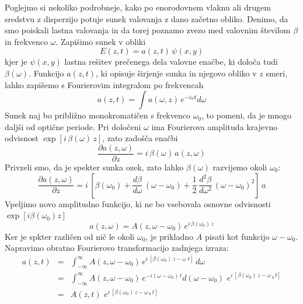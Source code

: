 \documentclass[11pt,fleqn]{book} %
\begin{document}
Poglejmo si nekoliko podrobneje, kako po enorodovnem vlaknu ali drugem
sredstvu z disperzijo potuje sunek valovanja z dano začetno obliko.
Denimo, da smo poiskali lastna valovanja in da torej poznamo zvezo
med valovnim številom $\beta$ in frekvenco $\omega$. Zapišimo sunek
v obliki 
\begin{equation}
E\left(z,t\right)=a\left(z,t\right)\,\psi\left(x,y\right)\label{9.61}
\end{equation}
 kjer je $\psi\left(x,y\right)$ lastna rešitev prečenega dela valovne
enačbe, ki določa tudi $\beta\left(\omega\right)$. Funkcijo $a\left(z,t\right)$,
ki opisuje širjenje sunka in njegovo obliko v $z$ smeri, lahko zapišemo
s Fourierovim integralom po frekvencah 
\begin{equation}
a\left(z,t\right)=\int a(\omega,z)\, e^{-i\omega t}d\omega\label{9.62}
\end{equation}
 Sunek naj bo približno monokromatičen s frekvenco $\omega_{0}$,
to pomeni, da je mnogo daljši od optične periode. Pri določeni $\omega$
ima Fourierova amplituda krajevno odvisnost $\exp[i\,\beta\left(\omega\right)\, z]$,
zato zadošča enačbi 
\begin{equation}
\frac{\partial a\left(z,\omega\right)}{\partial z}=i\,\beta\left(\omega\right)\, a\left(z,\omega\right)\label{9.63}
\end{equation}
 Privzeli smo, da je spekter sunka ozek, zato lahko $\beta\left(\omega\right)$
razvijemo okoli $\omega_{0}$: 
\begin{equation}
\frac{\partial a\left(z,\omega\right)}{\partial z}=i\,\left[\beta\left(\omega_{0}\right)+\frac{d\beta}{d\omega}\,\left(\omega-\omega_{0}\right)+\frac{1}{2}\,\frac{d^{2}\beta}{d\omega^{2}}\,\left(\omega-\omega_{0}\right)^{2}\right]\, a\label{9.64}
\end{equation}
 Vpeljimo novo amplitudno funkcijo, ki ne bo vsebovala osnovne odvisnosti
$\exp[i\beta\left(\omega_{0}\right)z]$ 
\begin{equation}
a\left(z,\omega\right)=A\left(z,\omega-\omega_{0}\right)\, e^{i\,\beta\left(\omega_{0}\right)\, z}\label{9.65}
\end{equation}
 Ker je spkter različen od nič le okoli $\omega_{0}$, je prikladno
$A$ pisati kot funkcijo $\omega-\omega_{0}$. Napravimo obratno Fourierovo
transformacijo zadnjega izraza: 
\begin{eqnarray}
a\left(z,t\right) & = & \int_{-\infty}^{\infty}A\left(z,\omega-\omega_{0}\right)\, e^{i\,[\beta\left(\omega_{0}\right)\, z-\omega\,\, t]}\, d\omega\label{9.66}\\
 & = & \int_{-\infty}^{\infty}A\left(z,\omega-\omega_{0}\right)\, e^{-i\left(\omega-\omega_{0}\right)\, t}d\left(\omega-\omega_{0}\right)\,\, e^{i\,[\beta\left(\omega_{0}\right)\, z-\omega\,_{0}\, t]}\nonumber \\
 & = & A\left(z,t\right)\,\, e^{i\,[\beta\left(\omega_{0}\right)\, z-\omega\,_{0}\, t]}\nonumber 
\end{eqnarray}
\end{document}
